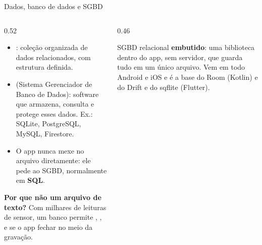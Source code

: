 \documentclass[aspectratio=169,10pt]{beamer}
\begin{document}
\begin{frame}{Dados, banco de dados e SGBD}
  \begin{columns}[c]
    \begin{column}{0.52\textwidth}
      \begin{itemize}
        \item {}: coleção organizada de dados relacionados, com estrutura definida.
        \item {} (Sistema Gerenciador de Banco de Dados): software que armazena, consulta e protege esses dados. Ex.: SQLite, PostgreSQL, MySQL, Firestore.
        \item O app nunca mexe no arquivo diretamente: ele pede ao SGBD, normalmente em \textbf{SQL}.
      \end{itemize}
      \begin{caixaambar}
        \textbf{Por que não um arquivo de texto?} Com milhares de leituras de sensor, um banco permite , ,  e  se o app fechar no meio da gravação.
      \end{caixaambar}
    \end{column}
    \begin{column}{0.46\textwidth}
      \centering
      \begin{conceito}[SQLite]
        SGBD relacional \textbf{embutido}: uma biblioteca dentro do app, sem servidor, que guarda tudo em um único arquivo. Vem em todo Android e iOS e é a base do Room (Kotlin) e do Drift e do sqflite (Flutter).
      \end{conceito}
    \end{column}
  \end{columns}
\end{frame}
\end{document}
